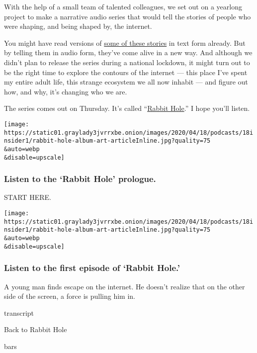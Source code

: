 With the help of a small team of talented colleagues, we set out on a
yearlong project to make a narrative audio series that would tell the
stories of people who were shaping, and being shaped by, the internet.

You might have read versions of
\href{https://www.nytimes3xbfgragh.onion/interactive/2019/06/08/technology/youtube-radical.html}{some
of these stories} in text form already. But by telling them in audio
form, they've come alive in a new way. And although we didn't plan to
release the series during a national lockdown, it might turn out to be
the right time to explore the contours of the internet --- this place
I've spent my entire adult life, this strange ecosystem we all now
inhabit --- and figure out how, and why, it's changing who we are.

The series comes out on Thursday. It's called
``\href{https://www.nytimes3xbfgragh.onion/2020/04/16/podcasts/rabbit-hole-internet-youtube-virus.html}{Rabbit
Hole}.'' I hope you'll listen.

\texttt{[image: https://static01.graylady3jvrrxbe.onion/images/2020/04/18/podcasts/18insider1/rabbit-hole-album-art-articleInline.jpg?quality=75\\\&auto=webp\\\&disable=upscale]}

\hypertarget{listen-to-the-rabbit-hole-prologue}{%
\subsubsection{Listen to the `Rabbit Hole'
prologue.}\label{listen-to-the-rabbit-hole-prologue}}

START HERE.

\texttt{[image: https://static01.graylady3jvrrxbe.onion/images/2020/04/18/podcasts/18insider1/rabbit-hole-album-art-articleInline.jpg?quality=75\\\&auto=webp\\\&disable=upscale]}

\hypertarget{listen-to-the-first-episode-of-rabbit-hole}{%
\subsubsection{Listen to the first episode of `Rabbit
Hole.'}\label{listen-to-the-first-episode-of-rabbit-hole}}

A young man finds escape on the internet. He doesn't realize that on the
other side of the screen, a force is pulling him in.

transcript

Back to Rabbit Hole

bars

